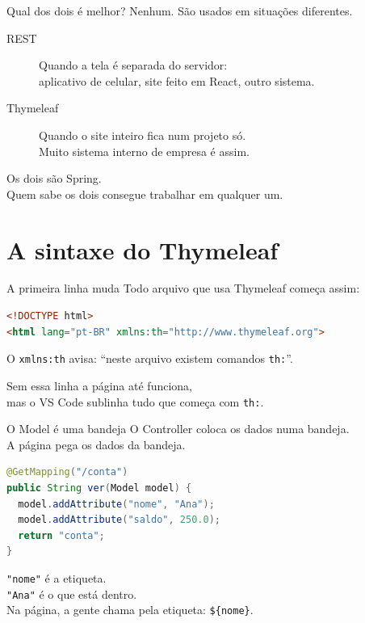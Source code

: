 \documentclass[aspectratio=169,11pt]{beamer}
\begin{document}
\begin{frame}{Qual dos dois é melhor?}
  Nenhum. São usados em situações diferentes.

  \vspace{0.6em}
  \begin{description}
    \item[REST] Quando a tela é separada do servidor:\\
      aplicativo de celular, site feito em React, outro sistema.
    \item[Thymeleaf] Quando o site inteiro fica num projeto só.\\
      Muito sistema interno de empresa é assim.
  \end{description}

  \vspace{0.6em}
  Os dois são Spring.\\
  Quem sabe os dois consegue trabalhar em qualquer um.
\end{frame}

\section{A sintaxe do Thymeleaf}

\begin{frame}[fragile]{A primeira linha muda}
  Todo arquivo que usa Thymeleaf começa assim:

\begin{lstlisting}[language=HTML,basicstyle=\ttfamily\footnotesize]
<!DOCTYPE html>
<html lang="pt-BR" xmlns:th="http://www.thymeleaf.org">
\end{lstlisting}

  \vspace{0.4em}
  O \texttt{xmlns:th} avisa: ``neste arquivo existem comandos \texttt{th:}''.

  \vspace{0.5em}
  Sem essa linha a página até funciona,\\
  mas o VS Code sublinha tudo que começa com \texttt{th:}.
\end{frame}

\begin{frame}[fragile]{O Model é uma bandeja}
  O Controller coloca os dados numa bandeja.\\
  A página pega os dados da bandeja.

\begin{lstlisting}[language=Java,basicstyle=\ttfamily\footnotesize]
@GetMapping("/conta")
public String ver(Model model) {
  model.addAttribute("nome", "Ana");
  model.addAttribute("saldo", 250.0);
  return "conta";
}
\end{lstlisting}

  \texttt{"nome"} é a etiqueta.\\
  \texttt{"Ana"} é o que está dentro.\\
  Na página, a gente chama pela etiqueta: \texttt{\$\{nome\}}.
\end{frame}
\end{document}
